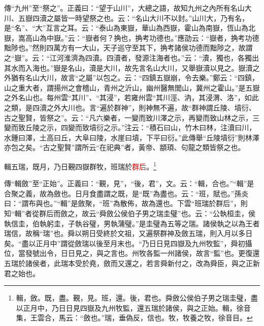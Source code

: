{\noindent\zhuan{}\fzbyks 傳“九州”至“祭之”。正義曰：“望于山川”，大總之語，故知九州之內所有名山大川、五嶽四瀆之屬皆一時望祭之也。云：“名山大川不以封。”山川大，乃有名，是“名”、“大”互言之耳。云：“泰山為東嶽，華山為西嶽，霍山為南嶽，恆山為北嶽，嵩高山為中嶽。”云：“嶽者何？捔也，捔考功德也。”應劭云：“嶽者，捔考功德黜陟也。”然則四萬方有一大山，天子巡守至其下，捔考諸侯功德而黜陟之，故謂之“嶽”。云：“江河淮濟為四瀆。四瀆者，發源注海者也。”云：“瀆，獨也，各獨出其水而入海也。”嶽是名山，瀆是大川，故先言名山大川，又舉嶽瀆以見之。嶽瀆之外猶有名山大川，故言“之屬”以包之。云：“四鎮五嶽崩，令去樂。”鄭云：“四鎮，山之重大者，謂揚州之會稽山，青州之沂山，幽州醫無閭山，冀州之霍山。”是五嶽之外名山也。每州雲“其川”、“其浸”，若雍州雲“其川涇、汭，其浸渭、洛”，如此之類，是四瀆之外大川也。言“遍於群神”，則神無不遍，故“群神謂丘陵、墳衍、古之聖賢，皆祭之”。云：“凡六樂者，一變而致川澤之示，再變而致山林之示，三變而致丘陵之示，四變而致墳衍之示。”注云：“積石曰山，竹木曰林，注瀆曰川，水鍾曰澤，土高曰丘，大阜曰陵，水崖曰墳，下平曰衍。”此傳舉“丘陵墳衍”則林澤亦包之矣。“古之聖賢”謂所云“在祀典”者，黃帝、顓頊、句龍之類皆祭之也。 \par}

輯五瑞，既月，乃日覲四嶽群牧，班瑞於\textcolor{red}{群后}。\footnote{輯，斂。既，盡。覲，見。班，還。後，君也。舜斂公侯伯子男之瑞圭璧，盡以正月中，乃日日見四嶽及九州牧監，還五瑞於諸侯，與之正始。輯，徐音集，王雲合，馬云：“斂也。”瑞，垂偽反，信也。牧，牧養之牧，徐音目。}

{\noindent\zhuan{}\fzbyks 傳“輯斂”至“正始”。正義曰：“覲，見”，“後，君”，文。云：“輯，合也。”“輯”是合聚之義，故為斂也。日月食盡謂之既，是“既”為盡也。云：“班，賦也。”孫炎曰：“謂布與也。”“輯”是斂聚，“班”為散佈，故為還也。下雲“班瑞於群后”，則知“輯”者從群后而斂之，故云“舜斂公侯伯子男之瑞圭璧”也。云：“公執桓圭，侯執信圭，伯執躬圭，子執谷璧，男執蒲璧。”是圭璧為五等之瑞。諸侯執之以為王者瑞信，故稱“瑞”也。舜以朔日受終於文祖，又遍祭群神及斂五瑞，則入月以多日矣。“盡以正月中”謂從斂瑞以後至月末也。“乃日日見四嶽及九州牧監”，舜初攝位，當發號出令，日日見之，與之言也。州牧各監一州諸侯，故言“監”也。更復還五瑞於諸侯者，此瑞本受於堯，斂而又還之，若言舜新付之，改為舜臣，與之正新君之始也。 \par}

